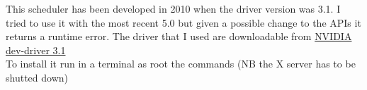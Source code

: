 \documentclass[a4paper,13pt]{article}
\begin{document}
\begin{multicols}{2}
    This scheduler has been developed in 2010 when the driver version was 3.1. I tried to use it with the most recent 5.0 but given a possible change to the APIs it returns a runtime error.
    The driver that I used are downloadable from \href{https://mega.co.nz/#!g49wnBaR!eVaf8DeGmDyPUV8VoJMtHRAHXDE4_-EWxwrmL6LCHWY}{NVIDIA dev-driver 3.1}\\
    To install it run in a terminal as root the commands (NB the X server has to be shutted down)
  \lstset{language=bash}
  \lstset{
      basicstyle=\ttfamily\footnotesize,
          breaklines=true,
          tabsize=2,
          showspaces=false,
          showstringspaces=false,
          framexleftmargin=5pt,
          framexrightmargin=5pt,
          framexbottommargin=5pt,
          framextopmargin=5pt,
  }
   

\end{multicols}
\end{document}
